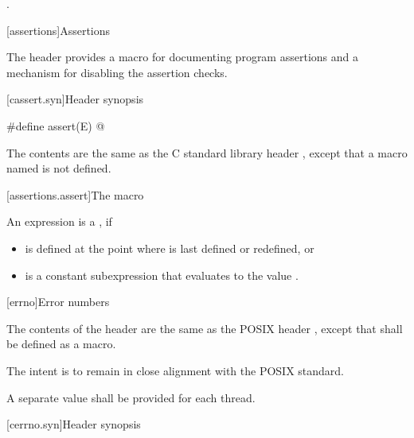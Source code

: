 \begin{itemdescr}
\pnum
\ensures
{}.
\end{itemdescr}

[assertions]{Assertions}

\pnum
The header 
provides a macro for documenting \Cpp{} program assertions and a mechanism
for disabling the assertion checks.

[cassert.syn]{Header  synopsis}

%
\begin{codeblock}
#define assert(E) @\seebelow@
\end{codeblock}

\pnum
{}%
The contents are the same as the C standard library header
,
except that a macro named 
is not defined.


[assertions.assert]{The  macro}

\pnum
An expression 
is a , if
\begin{itemize}
\item
{} is defined at the point where 
is last defined or redefined, or
\item
{} 
is a constant subexpression that evaluates to the value .
\end{itemize}

[errno]{Error numbers}

\pnum
The contents of the header  are the same as the POSIX header
, except that  shall be defined as a macro.
\begin{note}
The intent is to remain in close alignment with the POSIX standard.
\end{note}
A separate  value shall be provided for each thread.

[cerrno.syn]{Header  synopsis}


